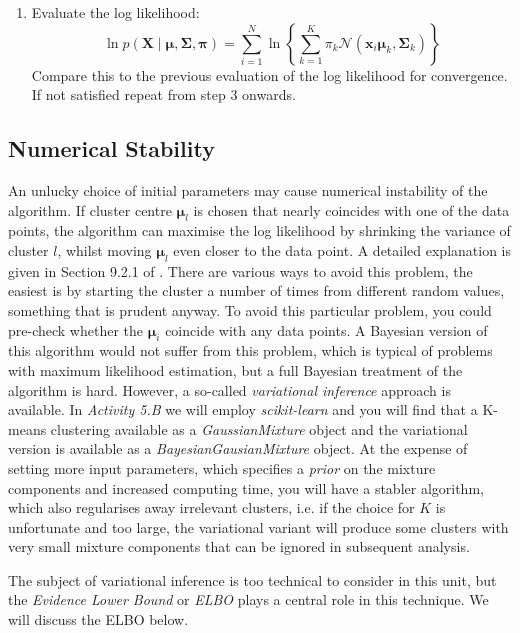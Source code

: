 \begin{enumerate}
\item Evaluate the log likelihood:
  \begin{equation}
    \ln p( \boldsymbol{X} \mid \boldsymbol{\mu}, \boldsymbol{\Sigma}, \boldsymbol{\pi} ) = \sum^N_{i=1} \ln \left\{ \sum^K_{k=1} \pi_k \mathcal{N}(\boldsymbol{x}_i \boldsymbol{\mu}_k,\boldsymbol{\Sigma}_k) \right\}
    \label{eq-mllh}
    \end{equation}
  Compare this to the previous evaluation of the log likelihood for convergence. If not satisfied repeat from step 3 onwards.
    
\end{enumerate}
\subsection{Numerical Stability}
An unlucky choice of initial parameters may cause numerical instability of the algorithm. If  cluster centre $\boldsymbol{\mu}_l$ is chosen that nearly coincides with one
of the data points, the algorithm can maximise the log likelihood by shrinking the variance of cluster $l$, whilst moving $\boldsymbol{\mu}_l$ even closer to the data point.
A detailed explanation  is given in Section 9.2.1 of \cite{bishop2006}. There are various ways to avoid this problem, the easiest is by starting the cluster a number of times
from different random values, something that is prudent anyway. To avoid this particular problem, you could pre-check whether the $\boldsymbol{\mu}_i$ coincide with any data
points. A Bayesian version of this algorithm would not suffer from this problem, which is typical of problems with maximum likelihood estimation, but a full
Bayesian treatment of the algorithm is hard. However, a so-called \emph{variational inference} approach is available. In \emph{Activity 5.B} we will employ
\emph{scikit-learn} and you will find that
a K-means clustering available as a \emph{GaussianMixture} object and the variational version is available as a \emph{BayesianGausianMixture} object. At the expense
of setting more input parameters, which specifies a \emph{prior} on the mixture components and increased computing time, you will have a stabler algorithm, which also
regularises away irrelevant clusters, i.e. if the choice for $K$ is unfortunate and too large, the variational variant will produce some
clusters with very small mixture components that can be ignored in subsequent analysis.

The subject of variational inference is too technical to consider in this unit, but the \emph{Evidence Lower Bound} or \emph{ELBO} plays a central role in this technique. We will
discuss the ELBO below.


